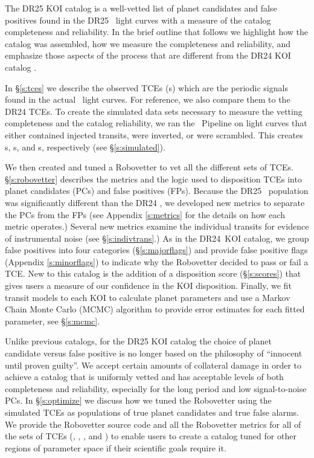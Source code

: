 The DR25 KOI catalog is a well-vetted list of planet candidates and false positives found in the DR25 \Kepler\ light curves with a measure of the catalog completeness and reliability. In the brief outline that follows we highlight how the catalog was assembled, how we measure the completeness and reliability, and emphasize those aspects of the process that are different from the DR24 KOI catalog \citep{Coughlin2016}.

In \S\ref{s:tces} we describe the observed TCEs (\opstce s) which are the periodic signals found in the actual \Kepler\ light curves. For reference, we also compare them to the DR24 TCEs. To create the simulated data sets necessary to measure the vetting completeness and the catalog reliability, we ran the \Kepler\ Pipeline on light curves that either contained injected transits, were inverted, or were scrambled. This creates \injtce s, \invtce s, and \scrtce s, respectively (see \S\ref{s:simulated}).  

We then created and tuned a Robovetter to vet all the different sets of TCEs. \S\ref{s:robovetter} describes the metrics and the logic used to disposition TCEs into planet candidates (PCs) and false positives (FPs).  Because the DR25 \opstce\ population was significantly different than the DR24 , we developed new metrics to separate the PCs from the FPs (see Appendix \ref{s:metrics} for the details on how each metric operates.) Several new metrics examine the individual transits for evidence of instrumental noise (see \S\ref{s:indivtrans}.) As in the DR24~KOI catalog, we group false positives into four categories (\S\ref{s:majorflags}) and provide false positive flags (Appendix \ref{s:minorflags}) to indicate why the Robovetter decided to pass or fail a TCE.  New to this catalog is the addition of a disposition score (\S\ref{s:scores}) that gives users a measure of our confidence in the KOI disposition. Finally, we fit transit models to each KOI to calculate planet parameters and use a Markov Chain Monte Carlo (MCMC)
algorithm to provide error estimates for each fitted parameter, see \S\ref{s:mcmc}.


Unlike previous catalogs, for the DR25 KOI catalog the choice of planet candidate versus false positive is no longer based on the philosophy of ``innocent until proven guilty''. We accept certain amounts of collateral damage in order to achieve a catalog that is uniformly vetted and has acceptable levels of both completeness and reliability, especially for the long period and low signal-to-noise PCs. In \S\ref{s:optimize} we discuss how we tuned the Robovetter using the simulated TCEs as populations of true planet candidates and true false alarms. We provide the Robovetter source code and all the Robovetter metrics for all of the sets of TCEs (\opstce, \injtce, \invtce, and \scrtce) to enable users to create a catalog tuned for other regions of parameter space if their scientific goals require it. 

